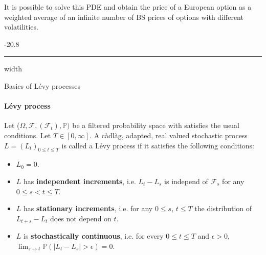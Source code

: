 \documentclass[a4paper,landscape,7pt,fleqn]{scrartcl}
\makeatletter
\renewcommand{\emph}[1]{\textbf{#1}}
\renewcommand{\subsubsection}{\@startsection{subsubsection}{1}{0mm}%
{-2\baselineskip}{0.8\baselineskip}%
{\hrule depth 0.2pt width\columnwidth\vspace*{1.2em}\normalsize\bfseries}}
\makeatother
\begin{document}
\begin{multicols*}{3}
It is possible to solve this PDE and obtain the price of a European option as a weighted average of an infinite number of BS prices of options with different volatilities.

\subsubsection{Basics of Lévy processes}

\paragraph{Lévy process}
Let ($\Omega, \mathcal{F}, (\mathcal{F}_t), \mathbb{P})$ be a filtered probability space with satisfies the usual conditions. Let $T \in [0, \infty]$. A càdlàg, adapted, real valued stochastic process $L = (L_t)_{0 \leq t \leq T}$ is called a Lévy process if it satisfies the following conditions:
\begin{itemize}
\item $L_0 = 0$.
\item $L$ has \emph{independent increments}, i.e. $L_t - L_s$ is independ of $\mathcal{F}_s$ for any $0 \leq s < t \leq T$.
\item $L$ has \emph{stationary increments}, i.e. for any $0 \leq s$, $t \leq T$ the distribution of $L_{t+s} - L_t$ does not depend on $t$.
\item $L$ is \emph{stochastically continuous}, i.e. for every $0 \leq t \leq T$ and $\epsilon > 0$, $\lim_{s \rightarrow t} \mathbb{P}(|L_t - L_s| > \epsilon) = 0$.
\end{itemize}


\end{multicols*}
\end{document}
